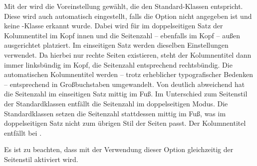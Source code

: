 Mit der 
 wird die
Voreinstellung gewählt, die den Standard-Klassen entspricht. Diese wird auch
automatisch eingestellt, falls die Option nicht angegeben ist und keine
\KOMAScript-Klasse erkannt wurde. Dabei wird für
 im doppelseitigen Satz der
Kolumnentitel im Kopf innen und die Seitenzahl -- ebenfalls im Kopf -- außen
ausgerichtet platziert. Im einseitigen Satz werden dieselben Einstellungen
verwendet. Da hierbei nur rechte Seiten existieren, steht der Kolumnentitel
dann immer linksbündig im Kopf, die Seitenzahl entsprechend rechtsbündig. Die
automatischen Kolumnentitel werden -- trotz erheblicher typografischer
Bedenken -- entsprechend
%
 in Großbuchstaben
umgewandelt. Von  deutlich
abweichend hat  die Seitenzahl
im einseitigen Satz mittig im Fuß. Im Unterschied zum Seitenstil  der Standardklassen
entfällt die Seitenzahl im doppelseitigen Modus. Die Standardklassen setzen
die Seitenzahl stattdessen mittig im Fuß, was im doppelseitigen Satz nicht zum
übrigen Stil der Seiten passt.
\iffalse %
Wer die Seitenzahl zurück haben will, kann dies
mit
\begin{lstcode}
  \cfoot[\pagemark]{}
\end{lstcode}
erreichen. %
\fi%
Der Kolumnentitel entfällt bei
.

Es ist zu beachten, dass mit der Verwendung dieser Option
gleichzeitig der Seitenstil
%
 aktiviert wird.
\iffalse%
Dies gilt auch, wenn die Option innerhalb eines Dokuments verwendet wird.%
\fi
%
\EndIndexGroup




